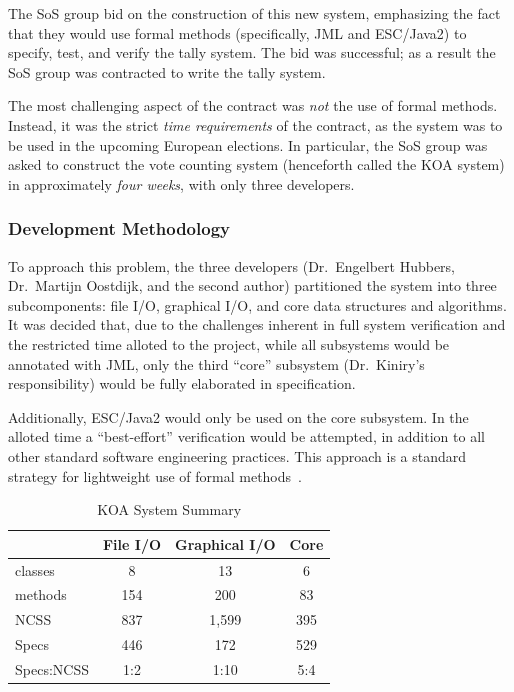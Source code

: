 \documentclass{llncs}
\begin{document}
The SoS group bid on the construction of this new system, emphasizing
the fact that they would use formal methods (specifically, JML and
ESC/Java2) to specify, test, and verify the tally system.  The bid was
successful; as a result the SoS group was contracted to write the
tally system.

The most challenging aspect of the contract was \emph{not} the use of
formal methods.  Instead, it was the strict \emph{time requirements}
of the contract, as the system was to be used in the upcoming European
elections.  In particular, the SoS group was asked to construct the
vote counting system (henceforth called the \textsc{KOA} system) in
approximately \emph{four weeks}, with only three developers.

\subsubsection{Development Methodology}

To approach this problem, the three developers (Dr.~Engelbert Hubbers,
Dr.~Martijn Oostdijk, and the second author) partitioned the system
into three subcomponents: file I/O, graphical I/O, and core
data structures and algorithms.  It was decided that, due to the
challenges inherent in full system verification and the restricted
time alloted to the project, while all subsystems would be annotated
with JML, only the third ``core'' subsystem (Dr.~Kiniry's
responsibility) would be fully elaborated in specification.

Additionally, ESC/Java2 would only be used on the core subsystem.  In
the alloted time a ``best-effort'' verification would be attempted, in
addition to all other standard software engineering practices.  This
approach is a standard strategy for lightweight use of formal
methods~\cite{ClarkeWing96}.

\begin{table}[htbp]
  \caption{KOA System Summary}
  \label{tab:KOA_System_Summary}
  \begin{center}
    \begin{tabular}{|l|ccc|}
      \hline
      \quad     & \textbf{File I/O} & \textbf{Graphical I/O} & \textbf{Core} \\
      \hline
       classes & 8                 & 13                     & 6             \\
       methods & 154               & 200                    & 83            \\
      NCSS      & 837               & 1,599                  & 395           \\
      Specs     & 446               & 172                    & 529           \\
      Specs:NCSS & 1:2              & 1:10                   & 5:4           \\
      \hline
    \end{tabular}
  \end{center}
\end{table}
\end{document}
